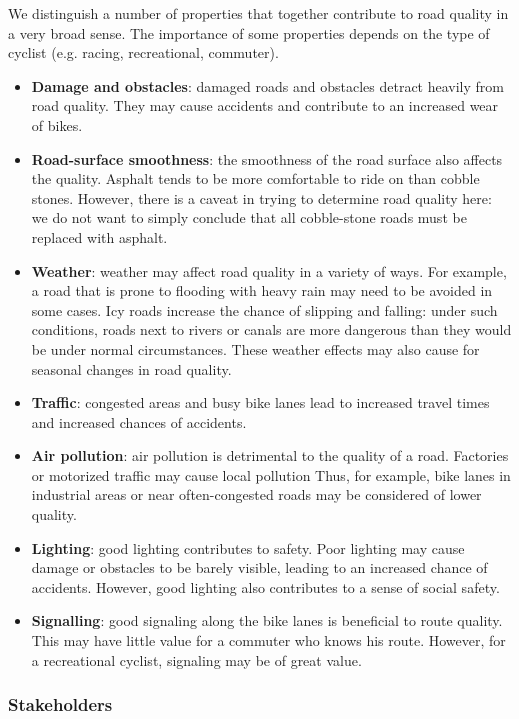 \documentclass[a4paper,11pt]{article}
\begin{document}
We distinguish a number of properties that together contribute to road quality in a very broad sense. The importance of some properties depends on the type of cyclist (e.g. racing, recreational, commuter).
\begin{itemize}\setlength{\itemsep}{-3pt}
\item \textbf{Damage and obstacles}: damaged roads and obstacles detract heavily from road quality. They may cause accidents and contribute to an increased wear of bikes.
\item \textbf{Road-surface smoothness}: the smoothness of the road surface also affects the quality. Asphalt tends to be more comfortable to ride on than cobble stones. However, there is a caveat in trying to determine road quality here: we do not want to simply conclude that all cobble-stone roads must be replaced with asphalt.
\item \textbf{Weather}: weather may affect road quality in a variety of ways. For example, a road that is prone to flooding with heavy rain may need to be avoided in some cases. Icy roads increase the chance of slipping and falling: under such conditions, roads next to rivers or canals are more dangerous than they would be under normal circumstances. These weather effects may also cause for seasonal changes in road quality.
\item \textbf{Traffic}: congested areas and busy bike lanes lead to increased travel times and increased chances of accidents.
\item \textbf{Air pollution}: air pollution is detrimental to the quality of a road. Factories or motorized traffic may cause local pollution Thus, for example, bike lanes in industrial areas or near often-congested roads may be considered of lower quality.
\item \textbf{Lighting}: good lighting contributes to safety. Poor lighting may cause damage or obstacles to be barely visible, leading to an increased chance of accidents. However, good lighting also contributes to a sense of social safety.
\item \textbf{Signalling}: good signaling along the bike lanes is beneficial to route quality. This may have little value for a commuter who knows his route. However, for a recreational cyclist, signaling may be of great value.
\end{itemize}

\subsubsection{Stakeholders}
\end{document}
